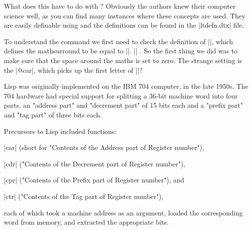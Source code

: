 What does this have to do with \latex? Obviously the \latex authors knew their computer science well, as you can find many instances where these concepts are used. They are easily definable using \tex and the definitions can be found in the |ltdefn.dtx| file.






\begin{teX}
\makeatletter
 \def\LaTeXe{%
   \mbox{\m@th%
    \if b\expandafter\@car\f@series\@nil\boldmath\fi
     \LaTeX\kern.15em2$_{\textstyle\varepsilon}$}}
\makeatother
\end{teX}

\scalebox{5}{\LaTeXe}

To understand the command we first need to check the definition of |\m@th|, which defines the mathsurround to be equal to |\z@|. |\def\m@th{\mathsurround\z@}| . So the first thing we did was to make sure that the space around the maths is set to zero. The strange setting is the |@car|, which picks up the first letter of |\boldmath|?

\makeatletter
\def\Latex{%
   \mbox{\m@th%
    \boldmath
     \LaTeX\kern.15em2$_{\textstyle\varepsilon}$}}
 

\makeatother

\scalebox{5}{\Latex}


Lisp was originally implemented on the IBM 704 computer, in the late 1950s. The 704 hardware had special support for splitting a 36-bit machine word into four parts, an "address part" and "decrement part" of 15 bits each and a "prefix part" and "tag part" of three bits each.

Precursors to Lisp included functions:

\begin{description}
\item{|car|} (short for "Contents of the Address part of Register number"),
\item{|cdr|} ("Contents of the Decrement part of Register number"),
\item{|cpr|} ("Contents of the Prefix part of Register number"), and
\item{|ctr|} ("Contents of the Tag part of Register number"),
\end{description}
each of which took a machine address as an argument, loaded the corresponding word from memory, and extracted the appropriate bits.














